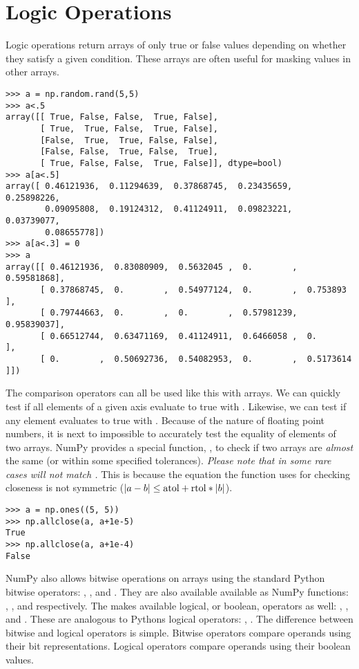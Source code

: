\label{lab:NumPySciPy}

\section*{Logic Operations}
Logic operations return arrays of only true or false values depending on whether they satisfy a given condition.
These arrays are often useful for masking values in other arrays.
\begin{lstlisting}
>>> a = np.random.rand(5,5)
>>> a<.5
array([[ True, False, False,  True, False],
       [ True,  True, False,  True, False],
       [False,  True,  True, False, False],
       [False, False,  True, False,  True],
       [ True, False, False,  True, False]], dtype=bool)
>>> a[a<.5]
array([ 0.46121936,  0.11294639,  0.37868745,  0.23435659,  0.25898226,
        0.09095808,  0.19124312,  0.41124911,  0.09823221,  0.03739077,
        0.08655778])
>>> a[a<.3] = 0
>>> a
array([[ 0.46121936,  0.83080909,  0.5632045 ,  0.        ,  0.59581868],
       [ 0.37868745,  0.        ,  0.54977124,  0.        ,  0.753893  ],
       [ 0.79744663,  0.        ,  0.        ,  0.57981239,  0.95839037],
       [ 0.66512744,  0.63471169,  0.41124911,  0.6466058 ,  0.        ],
       [ 0.        ,  0.50692736,  0.54082953,  0.        ,  0.5173614 ]])
\end{lstlisting}
The comparison operators can all be used like this with arrays.
We can quickly test if all elements of a given axis evaluate to true with .  Likewise, we can test if any element evaluates to true with .  
Because of the nature of floating point numbers, it is next to impossible to accurately test the equality of elements of two arrays.
NumPy provides a special function, , to check if two arrays are \emph{almost} the same (or within some specified tolerances).
\emph{Please note that in some rare cases  will not match .}  This is because the equation the function uses for checking closeness is not symmetric ($\left\lvert a-b\right\rvert \leq \mbox{atol} + \mbox{rtol}*\left\lvert b\right\rvert$).      
\begin{lstlisting}
>>> a = np.ones((5, 5))
>>> np.allclose(a, a+1e-5)
True
>>> np.allclose(a, a+1e-4)
False
\end{lstlisting}
NumPy also allows bitwise operations on arrays using the standard Python bitwise operators: \li{&}, \li{|}, and \li{^}.
They are also available available as NumPy functions: , , and  respectively.
The makes available logical, or boolean, operators as well: , , and .
These are analogous to Pythons logical operators: , .
The difference between bitwise and logical operators is simple.  
Bitwise operators compare operands using their bit representations.
Logical operators compare operands using their boolean values.

